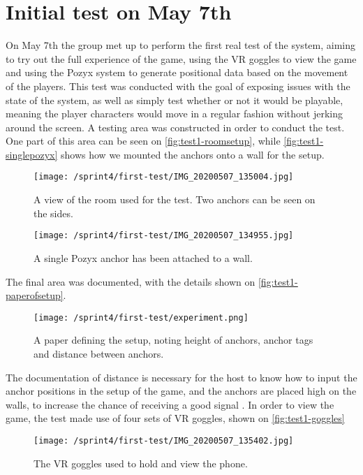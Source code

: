 \section{Initial test on May 7th}\label{sec:initial-test}
On May 7th the group met up to perform the first real test of the system, aiming to try out the full experience of the game, using the VR goggles to view the game and using the Pozyx system to generate positional data based on the movement of the players.
This test was conducted with the goal of exposing issues with the state of the system, as well as simply test whether or not it would be playable, meaning the player characters would move in a regular fashion without jerking around the screen.
A testing area was constructed in order to conduct the test.
One part of this area can be seen on \autoref{fig:test1-roomsetup}, while \autoref{fig:test1-singlepozyx} shows how we mounted the anchors onto a wall for the setup.
\begin{figure}[]
    \centering
    \texttt{[image: /sprint4/first-test/IMG\_20200507\_135004.jpg]}
    \caption{A view of the room used for the test. Two anchors can be seen on the sides.}
    \label{fig:test1-roomsetup}
\end{figure}
\begin{figure}[]
    \centering
    \texttt{[image: /sprint4/first-test/IMG\_20200507\_134955.jpg]}
    \caption{A single Pozyx anchor has been attached to a wall.}
    \label{fig:test1-singlepozyx}
\end{figure}
\noindent
The final area was documented, with the details shown on \autoref{fig:test1-paperofsetup}.
\begin{figure}[]
    \centering
    \texttt{[image: /sprint4/first-test/experiment.png]}
    \caption{A paper defining the setup, noting height of anchors, anchor tags and distance between anchors.}
    \label{fig:test1-paperofsetup}
\end{figure}
\noindent
The documentation of distance is necessary for the host to know how to input the anchor positions in the setup of the game, and the anchors are placed high on the walls, to increase the chance of receiving a good signal \cite{pozyx-AnchorHeights}.
In order to view the game, the test made use of four sets of VR goggles, shown on \autoref{fig:test1-goggles}
\begin{figure}[]
    \centering
    \texttt{[image: /sprint4/first-test/IMG\_20200507\_135402.jpg]}
    \caption{The VR goggles used to hold and view the phone.}
    \label{fig:test1-goggles}
\end{figure}
\noindent

